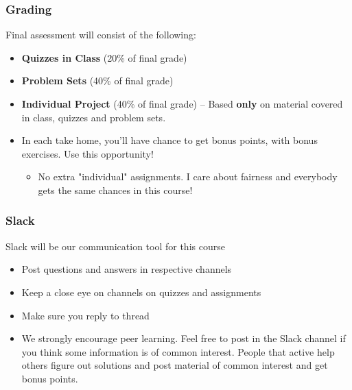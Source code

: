 \documentclass[compress, aspectratio=54]{beamer}
\begin{document}


\begin{frame}
\frametitle{Grading}
Final assessment will consist of the following:
\begin{itemize}
\item \textbf{Quizzes in Class} (20\% of final grade)
\item \textbf{Problem Sets} (40\% of final grade)
\item \textbf{Individual Project}  (40\% of final grade) -- Based \textbf{only} on material covered in class, quizzes and problem sets.
\item In each take home, you'll have chance to get bonus points, with bonus exercises. Use this opportunity!
\begin{itemize}

 \item No extra "individual" assignments. I care about fairness and everybody gets the same chances in this course!
 \end{itemize}

\end{itemize}
\end{frame}




\begin{frame}
\frametitle{Slack}
Slack will be our communication tool for this course
\begin{itemize}
\item Post questions and answers in respective channels
\item Keep a close eye on channels on quizzes and assignments
\item Make sure you reply to thread 
\item We strongly encourage peer learning. Feel free to post in the Slack channel if you think some information is of common interest.  People that active help others figure out solutions  and post material of common interest and get bonus points.  
\end{itemize}
\end{frame}
\end{document}
